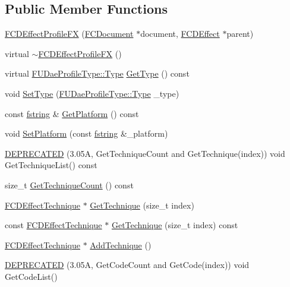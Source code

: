 \subsection*{Public Member Functions}
\begin{DoxyCompactItemize}
\item 
\hyperlink{classFCDEffectProfileFX_a3a6aa38eb1af1a180116c06c651311c5}{FCDEffectProfileFX} (\hyperlink{classFCDocument}{FCDocument} $\ast$document, \hyperlink{classFCDEffect}{FCDEffect} $\ast$parent)
\item 
virtual \hyperlink{classFCDEffectProfileFX_a30b48d2454decffb4c5b45f3986ac995}{$\sim$FCDEffectProfileFX} ()
\item 
virtual \hyperlink{namespaceFUDaeProfileType_ac10ea253a7a141708de2324a929f8a79}{FUDaeProfileType::Type} \hyperlink{classFCDEffectProfileFX_a711f7094d3d2ae864f336a4db558c3c5}{GetType} () const 
\item 
void \hyperlink{classFCDEffectProfileFX_a8da90f2c6a32edaa68a0430ecc143017}{SetType} (\hyperlink{namespaceFUDaeProfileType_ac10ea253a7a141708de2324a929f8a79}{FUDaeProfileType::Type} \_\-type)
\item 
const \hyperlink{classfm_1_1stringT}{fstring} \& \hyperlink{classFCDEffectProfileFX_a0d4d03330cc23e49a83f7dcb22df0b06}{GetPlatform} () const 
\item 
void \hyperlink{classFCDEffectProfileFX_a749574bde12f659c1bae707284f3d630}{SetPlatform} (const \hyperlink{classfm_1_1stringT}{fstring} \&\_\-platform)
\item 
\hyperlink{classFCDEffectProfileFX_a883c195463d15960a9d5d1d347ec3a41}{DEPRECATED} (3.05A, GetTechniqueCount and GetTechnique(index)) void GetTechniqueList() const 
\item 
size\_\-t \hyperlink{classFCDEffectProfileFX_af1fac9bef78005e8a0936cc4f4cf5b63}{GetTechniqueCount} () const 
\item 
\hyperlink{classFCDEffectTechnique}{FCDEffectTechnique} $\ast$ \hyperlink{classFCDEffectProfileFX_a3cfd88fb24777d0cd909834bf15ab99a}{GetTechnique} (size\_\-t index)
\item 
const \hyperlink{classFCDEffectTechnique}{FCDEffectTechnique} $\ast$ \hyperlink{classFCDEffectProfileFX_aa1f90851b8c0527d30017ecf8f247ea6}{GetTechnique} (size\_\-t index) const 
\item 
\hyperlink{classFCDEffectTechnique}{FCDEffectTechnique} $\ast$ \hyperlink{classFCDEffectProfileFX_ae6498c1d1bba41fdc63b98cbceb797d0}{AddTechnique} ()
\item 
\hyperlink{classFCDEffectProfileFX_a603840ea8a108748a8da26697c6f72ce}{DEPRECATED} (3.05A, GetCodeCount and GetCode(index)) void GetCodeList()

\end{DoxyCompactItemize}
